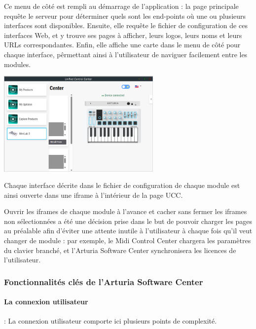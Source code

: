 \documentclass[francais]{rapportPFE}  %
\begin{document}
Ce menu de côté est rempli au démarrage de l'application : la page principale requête le serveur pour déterminer quels sont les end-points où une ou plusieurs interfaces sont disponibles. Ensuite, elle requête le fichier de configuration de ces interfaces Web, et y trouve ses pages à afficher, leurs logos, leurs noms et leurs URLs correspondantes. Enfin, elle affiche une carte dans le menu de côté pour chaque interface, pêrmettant ainsi à l'utilisateur de naviguer facilement entre les modules.

\begin{center}
    \centering
    \includegraphics[width=8cm]{graphics/menu_deplie.png}
    \label{fig:test1}
    \end{center}

Chaque interface décrite dans le fichier de configuration de chaque module est ainsi ouverte dans une iframe à l'intérieur de la page UCC.

Ouvrir les iframes de chaque module à l'avance et cacher sans fermer les iframes non sélectionnées a été une décision prise dans le but de pouvoir charger les pages au préalable afin d'éviter une attente inutile à l'utilisateur à chaque fois qu'il veut changer de module : par exemple, le Midi Control Center chargera les paramètres du clavier branché, et l'Arturia Software Center synchronisera les licences de l'utilisateur.

\subsubsection{Fonctionnalités clés de l'Arturia Software Center}

\paragraph{La connexion utilisateur}: La connexion utilisateur comporte ici plusieurs points de complexité. 
\end{document}
